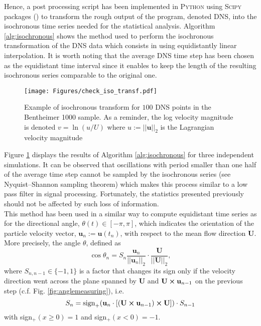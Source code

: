 Hence, a post processing script has been implemented in \textsc{Python} using \textsc{Scipy} packages (\cite{scipy}) to transform the rough output of the program, denoted DNS, into the isochronous time series needed for the statistical analysis.
Algorithm \ref{alg:isochronous} shows the method used to perform the isochronous transformation of the DNS data which consists in using equidistantly linear interpolation.
It is worth noting that the average DNS time step has been chosen as the equidistant time interval since it enables to keep the length of the resulting isochronous series comparable to the original one.\\
\begin{figure}
	\centering
	\texttt{[image: Figures/check\_iso\_transf.pdf]}
	\caption{Example of isochronous transform for $100$ DNS points in the Bentheimer 1000 sample. As a reminder, the log velocity magnitude is denoted $v=\ln{(u/U)}$ where $u:=||\textbf{u}||_2$ is the Lagrangian velocity magnitude}
	\label{fig:checkisotransf}
\end{figure}
Figure \ref{fig:checkisotransf} displays the results of Algorithm \ref{alg:isochronous} for three independent simulations.
It can be observed that oscillations with period smaller than one half of the average time step cannot be sampled by the isochronous series (see Nyquist–Shannon sampling theorem) which makes this process similar to a low pass filter in signal processing.
Fortunately, the statistics presented previously should not be affected by such loss of information.\\

This method has been used in a similar way to compute equidistant time series as for the directional angle, $\theta (t)\in[-\pi,\pi]$, which indicates the orientation of the particle velocity vector, $\textbf{u}_n :=\textbf{u}(t_n)$, with respect to the mean flow direction $\textbf{U}$.
More precisely, the angle $\theta$, defined as
\begin{equation}
\cos \theta_n = S_{n} \frac{\textbf{u}_n}{||\textbf{u}_n||_2 }\cdot \frac{\textbf{U}}{||\textbf{U}||_2},
\end{equation}
where $S_{n,n-1}\in\{-1,1\}$ is a factor that changes its sign only if the velocity direction went across the plane spanned by $\textbf{U}$ and $\textbf{U}\cross\textbf{u}_{n-1}$ on the previous step (c.f. Fig. \ref{fig:anglemeasuring}), i.e.
\begin{equation}
S_{n} = \mathrm{sign}_+(\textbf{u}_n\cdot [(\textbf{U}\cross\textbf{u}_{n-1})\cross \textbf{U}])\cdot S_{n-1} 
\end{equation}
with sign$_+(x\geq 0)=1$ and sign$_+(x< 0)=-1$.


